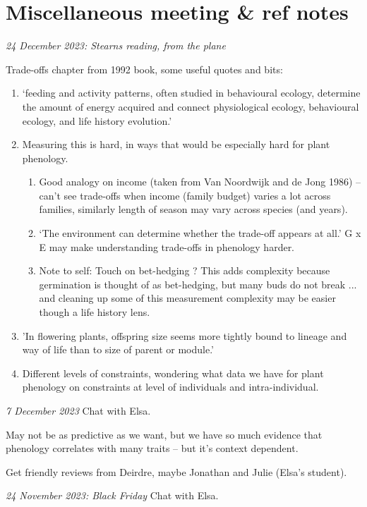 \documentclass[11pt]{article}
\begin{document}
\clearpage
\section{Miscellaneous meeting \& ref notes}

\emph{24 December 2023: Stearns reading, from the plane}

Trade-offs chapter from 1992 book, some useful quotes and bits:
\begin{enumerate}
\item `feeding and activity patterns, often studied in behavioural ecology, determine the amount of energy acquired  and connect physiological ecology, behavioural ecology, and life history evolution.'
\item Measuring this is hard, in ways that would be especially hard for plant phenology.
\begin{enumerate}
\item Good analogy on income (taken from Van Noordwijk and de Jong 1986) -- can't see trade-offs when income (family budget) varies a lot across families, similarly length of season may vary across species (and years). 
\item `The environment can determine whether the trade-off appears at all.' G x E may make understanding trade-offs in phenology harder. 
\item Note to self: Touch on bet-hedging ? This adds complexity because germination is thought of as bet-hedging, but many buds do not break ... and cleaning up some of this measurement complexity may be easier though a life history lens. 
\end{enumerate}
\item 'In flowering plants, offspring size seems more tightly bound to lineage and way of life than to size of parent or module.'
\item Different levels of constraints, wondering what data we have for plant phenology on constraints at level of individuals and intra-individual. 
\end{enumerate}


\emph{7 December 2023} Chat with Elsa.

May not be as predictive as we want, but we have so much evidence that phenology correlates with many traits -- but it's context dependent. 

Get friendly reviews from Deirdre, maybe Jonathan and Julie (Elsa's student).

\emph{24 November 2023: Black Friday} Chat with Elsa.
\end{document}
